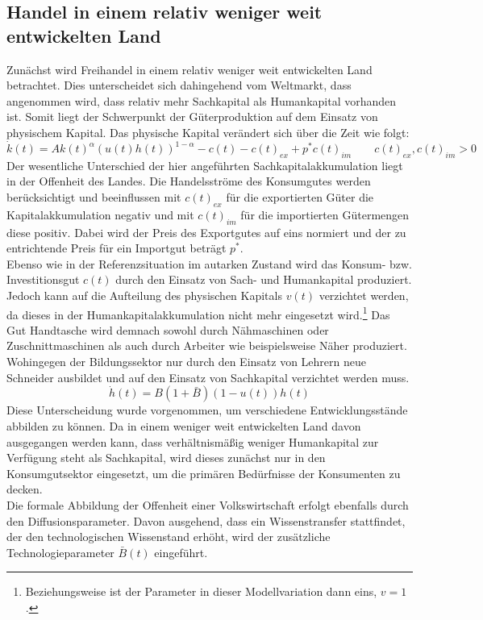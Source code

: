 \subsection{Handel in einem relativ weniger weit entwickelten Land}
Zunächst wird Freihandel in einem relativ weniger weit entwickelten Land betrachtet. Dies unterscheidet sich dahingehend vom Weltmarkt, dass angenommen wird, dass relativ mehr Sachkapital als Humankapital vorhanden ist. Somit liegt der Schwerpunkt der Güterproduktion auf dem Einsatz von physischem Kapital. Das physische Kapital verändert sich über die Zeit wie folgt: 
\begin{equation}
\dot{k}(t)=Ak(t)^\alpha(u(t)h(t))^{1-\alpha}-c(t)-c(t)_{ex}+p^*c(t)_{im} \qquad{c(t)_{ex}, c(t)_{im}>0}
\end{equation}
Der wesentliche Unterschied der hier angeführten Sachkapitalakkumulation liegt in der Offenheit des Landes. Die Handelsströme des Konsumgutes werden berücksichtigt und beeinflussen mit $c(t)_{ex}$ für die exportierten Güter die Kapitalakkumulation negativ und mit $c(t)_{im}$ für die importierten Gütermengen diese positiv. Dabei wird der Preis des Exportgutes auf eins normiert und der zu entrichtende Preis für ein Importgut beträgt $p^*$.\\
Ebenso wie in der Referenzsituation im autarken Zustand wird das Konsum- bzw. Investitionsgut $c(t)$ durch den Einsatz von Sach- und Humankapital produziert. Jedoch kann auf die Aufteilung des physischen Kapitals $v(t)$ verzichtet werden, da dieses in der Humankapitalakkumulation nicht mehr eingesetzt wird.\footnote{Beziehungsweise ist der Parameter in dieser Modellvariation dann eins, $v=1$.} Das Gut Handtasche wird demnach sowohl durch Nähmaschinen oder Zuschnittmaschinen als auch durch Arbeiter wie beispielsweise Näher produziert. Wohingegen der Bildungssektor nur durch den Einsatz von Lehrern neue Schneider ausbildet und auf den Einsatz von Sachkapital verzichtet werden muss.
\begin{equation}
\dot{h}(t)=B(1+\bar{B})(1-u(t))h(t)
\end{equation}
Diese Unterscheidung wurde vorgenommen, um verschiedene Entwicklungsstände abbilden zu können. Da in einem weniger weit entwickelten Land davon ausgegangen werden kann, dass verhältnismä{\ss}ig weniger Humankapital zur Verfügung steht als Sachkapital, wird dieses zunächst nur in den Konsumgutsektor eingesetzt, um die primären Bedürfnisse der Konsumenten zu decken.\\
Die formale Abbildung der Offenheit einer Volkswirtschaft erfolgt ebenfalls durch den Diffusionsparameter. Davon ausgehend, dass ein Wissenstransfer stattfindet, der den technologischen Wissenstand erhöht, wird der zusätzliche Technologieparameter $\bar{B}(t)$ eingeführt. 
